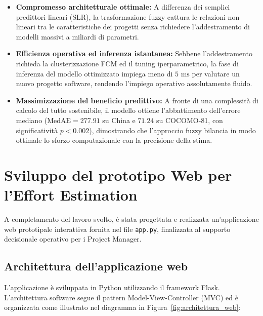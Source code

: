 \documentclass[11pt, a4paper]{article}
\begin{document}
\begin{itemize}
    \item \textbf{Compromesso architetturale ottimale:} A differenza dei semplici predittori lineari (SLR), la trasformazione fuzzy cattura le relazioni non lineari tra le caratteristiche dei progetti senza richiedere l'addestramento di modelli massivi a miliardi di parametri.
    \item \textbf{Efficienza operativa ed inferenza istantanea:} Sebbene l'addestramento richieda la clusterizzazione FCM ed il tuning iperparametrico, la fase di inferenza del modello ottimizzato impiega meno di $5\text{ ms}$ per valutare un nuovo progetto software, rendendo l'impiego operativo assolutamente fluido.
    \item \textbf{Massimizzazione del beneficio predittivo:} A fronte di una complessità di calcolo del tutto sostenibile, il modello ottiene l'abbattimento dell'errore mediano ($\text{MedAE} = 277.91$ su China e $71.24$ su COCOMO-81, con significatività $p < 0.002$), dimostrando che l'approccio fuzzy bilancia in modo ottimale lo sforzo computazionale con la precisione della stima.
\end{itemize}

\section{Sviluppo del prototipo Web per l'Effort Estimation}\label{sec:prototipo}
A completamento del lavoro svolto, è stata progettata e realizzata un'applicazione web prototipale interattiva fornita nel file \texttt{app.py}, finalizzata al supporto decisionale operativo per i Project Manager.

\subsection{Architettura dell'applicazione web}
L'applicazione è sviluppata in Python utilizzando il framework Flask.
L'architettura software segue il pattern Model-View-Controller (MVC) ed è organizzata come illustrato nel diagramma in Figura~\ref{fig:architettura_web}:
\end{document}
